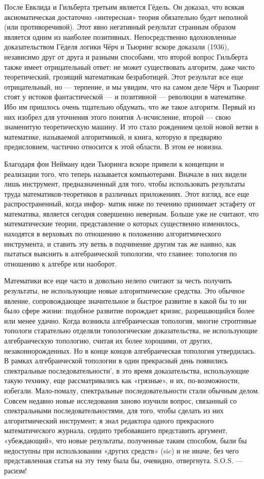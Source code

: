 \documentclass{mai_book}
\begin{document}
{{   После Евклида и Гильберта третьим является Гёдель. Он доказал, что всякая аксиоматическая достаточно «интересная» теория обязательно будет неполной (или противоречивой). Этот явно негативный результат странным образом является одним из наиболее позитивных.
\newpage
{}
Непосредственно вдохновленные доказательством Гёделя логики Чёрч и Тьюринг вскоре доказали (1936), независимо друг от друга и разными способами, что второй вопрос Гильберта также имеет отрицательный ответ: не может существовать алгоритм, даже чисто теоретический, грозящий математикам безработицей. Этот результат все еще отрицательный, но — терпение, и мы увидим, что на самом деле Чёрч и Тьюринг стоят у истоков фантастической — и позитивной — революции в математике. Ибо им пришлось очень тщательно обдумать, что же такое алгоритм. Первый из них изобрел для уточнения этого понятия A-исчисление, второй — свою знаменитую теоретическую машину. И это стало рождением целой новой ветви в математике, называемой алгоритмикой, и книга, которую я предваряю предисловием, частично относится к этой области. В этом ее новизна.

   Благодаря фон Нейману идеи Тьюринга вскоре привели к концепции и реализации того, что теперь называется компьютерами. Вначале в них видели лишь инструмент, предназначенный для того, чтобы использовать результаты труда математиков-теоретиков в различных приложениях. Этот взгляд, все еще распространенный, когда инфор- матик ниже по течению принимает эстафету от математика, является сегодня совершенно неверным. Больше уже не считают, что математические теории, представление о которых существенно изменилось, находятся в верховьях по отношению к положению алгоритмического инструмента, и ставить эту ветвь в подчинение другим так же наивно, как пытаться выяснить в алгебраической топологии, что главнее: топология по отношению к алгебре или наоборот.

   Математики все еще часто и довольно нелепо считают за честь получить результаты, не использующие новые алгоритмические средства. Это обычное явление, сопровождающее значительное и быстрое развитие в какой бы то ни было сфере жизни: подобное развитие порождает кризис, разрешающийся более или менее удачно. Когда возникла алгебраическая топология, многие строптивые топологи старательно отделяли топологические доказательства, не использующие алгебраическую топологию, считая их более хорошими, от других, незаконнорожденных. Но в конце концов алгебраическая топология утвердилась. В рамках алгебраической топологии в один прекрасный день появились спектральные последовательности', в это время доказательства, использующие такую технику, еще рассматривались как «грязные», и их, по-возможности, избегали. Мало-помалу, спектральные последовательности стали обычным делом. Совсем недавно новые исследования заново изучили вопрос, связанный со спектральными последовательностями, для того, чтобы сделать из них алгоритмический инструмент;
\newpage
я знал редактора одного прекрасного математического журнала, сердито требовавшего представить аргумент, «убеждающий», что новые результаты, полученные таким способом, были бы недоступны при использовании «других средств» (sic) и не иначе, без чего представленная статья на эту тему была бы, очевидно, отвергнута. S.O.S. — расизм!

}}
\end{document}
